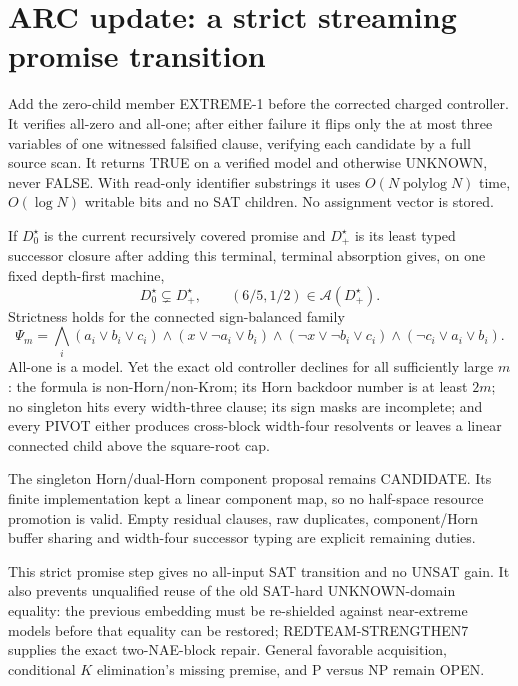 \section{ARC update: a strict streaming promise transition}

Add the zero-child member \textsc{EXTREME-1} before the corrected charged
controller.  It verifies all-zero and all-one; after either failure it flips
only the at most three variables of one witnessed falsified clause, verifying
each candidate by a full source scan.  It returns TRUE on a verified model
and otherwise UNKNOWN, never FALSE.  With read-only identifier substrings it
uses $O(N\operatorname{polylog}N)$ time, $O(\log N)$ writable bits and no SAT
children.  No assignment vector is stored.

If $D_0^\star$ is the current recursively covered promise and $D_+^\star$ is
its least typed successor closure after adding this terminal, terminal
absorption gives, on one fixed depth-first machine,
\[
D_0^\star\subsetneq D_+^\star,
\qquad (6/5,1/2)\in\mathcal A(D_+^\star).
\]
Strictness holds for the connected sign-balanced family
\[
\Psi_m=\bigwedge_i(a_i\vee b_i\vee c_i)
\wedge(x\vee\neg a_i\vee b_i)
\wedge(\neg x\vee\neg b_i\vee c_i)
\wedge(\neg c_i\vee a_i\vee b_i).
\]
All-one is a model.  Yet the exact old controller declines for all sufficiently
large $m$: the formula is non-Horn/non-Krom; its Horn backdoor number is at
least $2m$; no singleton hits every width-three clause; its sign masks are
incomplete; and every PIVOT either produces cross-block width-four resolvents
or leaves a linear connected child above the square-root cap.

The singleton Horn/dual-Horn component proposal remains CANDIDATE.  Its
finite implementation kept a linear component map, so no half-space resource
promotion is valid.  Empty residual clauses, raw duplicates, component/Horn
buffer sharing and width-four successor typing are explicit remaining duties.

This strict promise step gives no all-input SAT transition and no UNSAT gain.
It also prevents unqualified reuse of the old SAT-hard UNKNOWN-domain equality:
the previous embedding must be re-shielded against near-extreme models before
that equality can be restored; REDTEAM-STRENGTHEN7 supplies the exact
two-NAE-block repair.  General favorable acquisition, conditional
$K$ elimination's missing premise, and P versus NP remain OPEN.
